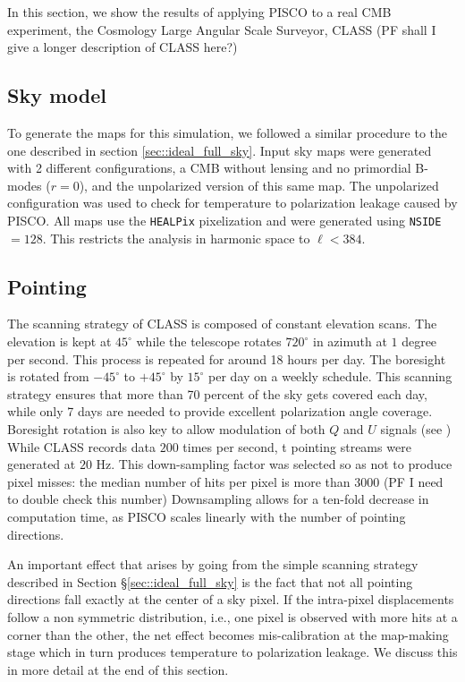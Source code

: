 \documentclass[a4paper,11pt]{article}
\begin{document}
In this section, we show the results of applying PISCO to a real CMB experiment, the Cosmology Large Angular Scale Surveyor, CLASS\cite{2016SPIE.9914E..1KH} (PF shall I give a longer description of CLASS here?)

\subsection{Sky model}

To generate the maps for this simulation, we followed a similar procedure to the one described in section \ref{sec::ideal_full_sky}. Input sky maps were generated with 2 different configurations, a CMB without lensing and no primordial B-modes ($r=0$), and the unpolarized version of this same map. The unpolarized configuration was used to check for temperature to polarization leakage caused by PISCO. All maps use the \texttt{HEALPix} pixelization and were generated using \texttt{NSIDE}$=128$. This restricts the analysis in harmonic space to $\ell < 384$.

\subsection{Pointing}

The scanning strategy of CLASS is composed of constant elevation scans. The elevation is kept at $45^{\circ}$ while the telescope rotates $720^\circ$ in azimuth at $1$ degree per second. This process is repeated for around 18 hours per day. The boresight is rotated from $-45^{\circ}$ to $+45^{\circ}$ by $15^{\circ}$ per day on a weekly schedule. This scanning strategy ensures that more than 70 percent of the sky gets covered each day, while only 7 days are needed to provide excellent polarization angle coverage. Boresight rotation is also key to allow modulation of both $Q$ and $U$ signals (see \cite{2016SPIE.9914E..1KH}) While CLASS records data $200$ times per second, t pointing streams were generated at $20$ Hz. This down-sampling factor was selected so as not to produce pixel misses: the median number of hits per pixel is more than $3000$ (PF I need to double check this number) Downsampling allows for a ten-fold decrease in computation time, as PISCO scales linearly with the number of pointing directions.

An important effect that arises by going from the simple scanning strategy described in Section \S\ref{sec::ideal_full_sky} is the fact that not all pointing directions fall exactly at the center of a sky pixel. If the intra-pixel displacements follow a non symmetric distribution, i.e., one pixel is observed with more hits at a corner than the other, the net effect becomes mis-calibration at the map-making stage which in turn produces temperature to polarization leakage. We discuss this in more detail at the end of this section.
\end{document}

